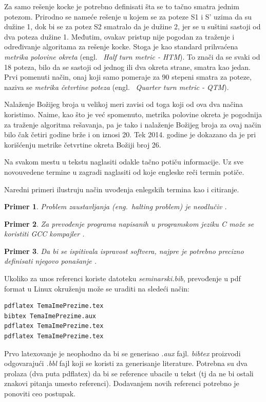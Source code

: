 \documentclass[a4paper]{article}
\newtheorem{primer}{Primer}[section]
\begin{document}
Za samo rešenje kocke je potrebno definisati šta se to tačno smatra jednim potezom. Prirodno se nameće rešenje u kojem se za poteze S1 i S' uzima da su dužine 1, dok bi se za potez S2 smatralo da je dužine 2, jer se u suštini sastoji od dva poteza dužine 1. Međutim, ovakav pristup nije pogodan za traženje i određivanje algoritama za rešenje kocke. Stoga je kao standard prihvaćena \emph{metrika polovine okreta} (engl. ~{\em Half turn metric - HTM}). To znači da se svaki od 18 poteza, bilo da se sastoji od jednog ili dva okreta strane, smatra kao jedan. Prvi pomenuti način, onaj koji samo pomeraje za 90 stepeni smatra za poteze, naziva se \emph{metrika četvrtine poteza} (engl. ~{\em Quarter turn metric - QTM}). 

Nalaženje Božijeg broja u velikoj meri zavisi od toga koji od ova dva načina koristimo. Naime, kao što je već spomenuto, metrika polovine okreta je pogodnija za traženje algoritma rešavanja, pa je tako i nalaženje Božijeg broja za ovaj način bilo čak četiri godine brže i on iznosi 20. Tek 2014. godine je dokazano da je pri korišćenju metrike četvrtine okreta Božiji broj 26.

Na svakom mestu u tekstu naglasiti odakle tačno potiču informacije. Uz sve novouvedene termine u zagradi naglasiti od koje engleske reči termin potiče. 

Naredni primeri ilustruju način uvođenja enlegskih termina kao i citiranje.

\begin{primer}
Problem zaustavljanja (eng.~{\em halting problem}) je neodlučiv \cite{haltingproblem}.
\end{primer}

\begin{primer}
Za prevođenje programa napisanih u programskom jeziku C može se koristiti GCC kompajler \cite{gcc}.
\end{primer}

\begin{primer}
 Da bi se ispitivala ispravost softvera, najpre je potrebno precizno definisati njegovo ponašanje \cite{laski2009software}. 
\end{primer}

Ukoliko za unos referenci koriste datoteku {\em seminarski.bib},  prevođenje u pdf format u Linux okruženju može se uraditi na sledeći način:
\begin{verbatim}
pdflatex TemaImePrezime.tex 
bibtex TemaImePrezime.aux 
pdflatex TemaImePrezime.tex 
pdflatex TemaImePrezime.tex 
\end{verbatim}
Prvo latexovanje je neophodno da bi se generisao {\em .aux} fajl. {\em bibtex} proizvodi odgovarajući {\em .bbl} fajl koji se koristi za generisanje literature. 
Potrebna su dva prolaza (dva puta pdflatex) da bi se reference ubacile u tekst (tj da ne bi ostali znakovi pitanja umesto referenci). Dodavanjem novih referenci potrebno je ponoviti ceo postupak.  
\end{document}
